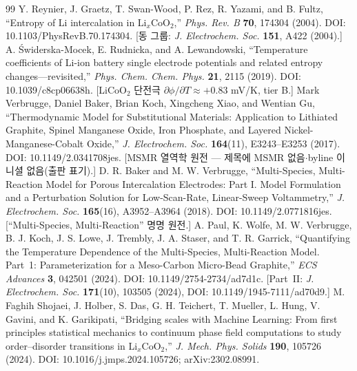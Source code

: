 \begin{thebibliography}{99}
 Y. Reynier, J. Graetz, T. Swan-Wood, P. Rez, R. Yazami, and B. Fultz, ``Entropy of Li intercalation in Li$_x$CoO$_2$,'' \emph{Phys. Rev. B} \textbf{70}, 174304 (2004). DOI: 10.1103/PhysRevB.70.174304. [동 그룹: \emph{J. Electrochem. Soc.} \textbf{151}, A422 (2004).]
 A. {\'S}widerska-Mocek, E. Rudnicka, and A. Lewandowski, ``Temperature coefficients of Li-ion battery single electrode potentials and related entropy changes---revisited,'' \emph{Phys. Chem. Chem. Phys.} \textbf{21}, 2115 (2019). DOI: 10.1039/c8cp06638h. [LiCoO$_2$ 단전극 $\partial\phi/\partial T\approx+0.83$ mV/K, tier B.]
 Mark Verbrugge, Daniel Baker, Brian Koch, Xingcheng Xiao, and Wentian Gu, ``Thermodynamic Model for Substitutional Materials: Application to Lithiated Graphite, Spinel Manganese Oxide, Iron Phosphate, and Layered Nickel-Manganese-Cobalt Oxide,'' \emph{J. Electrochem. Soc.} \textbf{164}(11), E3243--E3253 (2017). DOI: 10.1149/2.0341708jes. [MSMR 열역학 원전 --- 제목에 MSMR 없음$\cdot$byline 이니셜 없음(출판 표기).]
 D. R. Baker and M. W. Verbrugge, ``Multi-Species, Multi-Reaction Model for Porous Intercalation Electrodes: Part I. Model Formulation and a Perturbation Solution for Low-Scan-Rate, Linear-Sweep Voltammetry,'' \emph{J. Electrochem. Soc.} \textbf{165}(16), A3952--A3964 (2018). DOI: 10.1149/2.0771816jes. [``Multi-Species, Multi-Reaction'' 명명 원전.]
 A. Paul, K. Wolfe, M. W. Verbrugge, B. J. Koch, J. S. Lowe, J. Trembly, J. A. Staser, and T. R. Garrick, ``Quantifying the Temperature Dependence of the Multi-Species, Multi-Reaction Model. Part~1: Parameterization for a Meso-Carbon Micro-Bead Graphite,'' \emph{ECS Advances} \textbf{3}, 042501 (2024). DOI: 10.1149/2754-2734/ad7d1c. [Part~II: \emph{J. Electrochem. Soc.} \textbf{171}(10), 103505 (2024), DOI: 10.1149/1945-7111/ad70d9.]
 M. Faghih Shojaei, J. Holber, S. Das, G. H. Teichert, T. Mueller, L. Hung, V. Gavini, and K. Garikipati, ``Bridging scales with Machine Learning: From first principles statistical mechanics to continuum phase field computations to study order--disorder transitions in Li$_x$CoO$_2$,'' \emph{J. Mech. Phys. Solids} \textbf{190}, 105726 (2024). DOI: 10.1016/j.jmps.2024.105726; arXiv:2302.08991.
\end{thebibliography}
